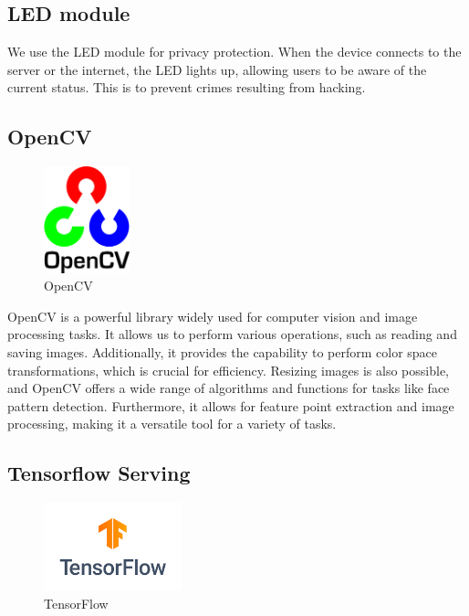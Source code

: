 \subsection{\textbf{LED module}}
We use the LED module for privacy protection. When the device connects to the server or the internet, the LED lights up, allowing users to be aware of the current status. This is to prevent crimes resulting from hacking.\\

\subsection{\textbf{OpenCV}}

\begin{figure}[htp]
\centering
\includegraphics[width=2.5cm]{images/opencv.png}
\caption{OpenCV}
\label{fig:opencv}
\end{figure}

OpenCV is a powerful library widely used for computer vision and image processing tasks. It allows us to perform various operations, such as reading and saving images. Additionally, it provides the capability to perform color space transformations, which is crucial for efficiency. Resizing images is also possible, and OpenCV offers a wide range of algorithms and functions for tasks like face pattern detection. Furthermore, it allows for feature point extraction and image processing, making it a versatile tool for a variety of tasks.\\



\subsection{\textbf{Tensorflow Serving}}

\begin{figure}[htp]
\centering
\includegraphics[width=4cm]{images/tensorflow.png}
\caption{TensorFlow}
\label{fig:tensorflow}
\end{figure}

